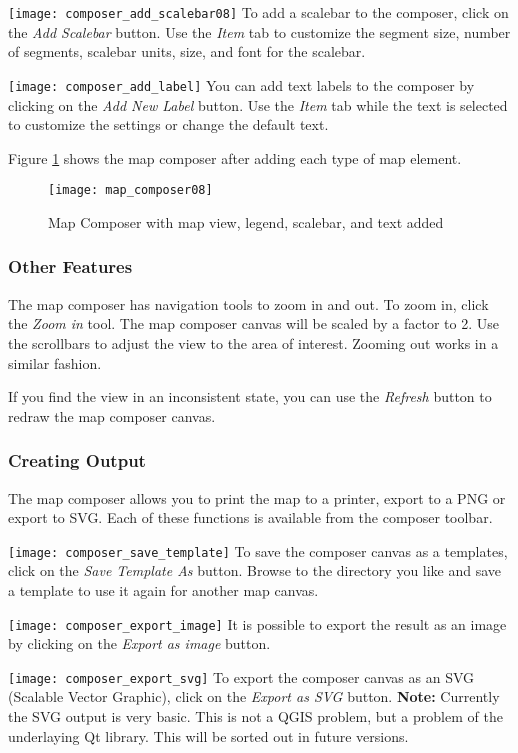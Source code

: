 \texttt{[image: composer\_add\_scalebar08]} To
add a scalebar to the composer, click on the \textit{Add Scalebar} button. Use
the \textit{Item} tab to customize the segment size, number of segments,
scalebar units, size, and font for the scalebar.

\texttt{[image: composer\_add\_label]} You can
add text labels to the composer by clicking on the \textit{Add New Label}
button. Use the \textit{Item} tab while the text is selected to customize the
settings or change the default text.

Figure \ref{fig:map_composer_complete} shows the map composer after adding
each type of map element.
\begin{figure}[h]
   \begin{center}
   \caption{Map Composer with map view, legend, scalebar, and text added}\label{fig:map_composer_complete}\smallskip
   \texttt{[image: map\_composer08]}
\end{center}  
\end{figure}

\subsubsection{Other Features}

The map composer has navigation tools to zoom in and out. To zoom in, click
the \textit{Zoom in} tool. The map composer canvas will be scaled by a factor to 2. Use
the scrollbars to adjust the view to the area of interest. Zooming out works
in a similar fashion.

If you find the view in an inconsistent state, you can use the \textit{Refresh} button
to redraw the map composer canvas.

\subsubsection{Creating Output}

The map composer allows you to print the map to a printer, export to a PNG or
export to SVG. Each of these functions is available from the composer toolbar.

\texttt{[image: composer\_save\_template]} To save the composer canvas 
as a templates, click on the \textit{Save Template As} button. Browse to the directory 
you like and save a template to use it again for another map canvas.

\texttt{[image: composer\_export\_image]} It is possible to export the result 
as an image by clicking on the \textit{Export as image} button. 

\texttt{[image: composer\_export\_svg]} To export the composer canvas as an 
SVG (Scalable Vector Graphic), click on the \textit{Export as SVG} button. 
\textbf{Note:} Currently the SVG output is very basic. This is not a QGIS problem, but a
problem of the underlaying Qt library. This will be sorted out in future versions.
 
